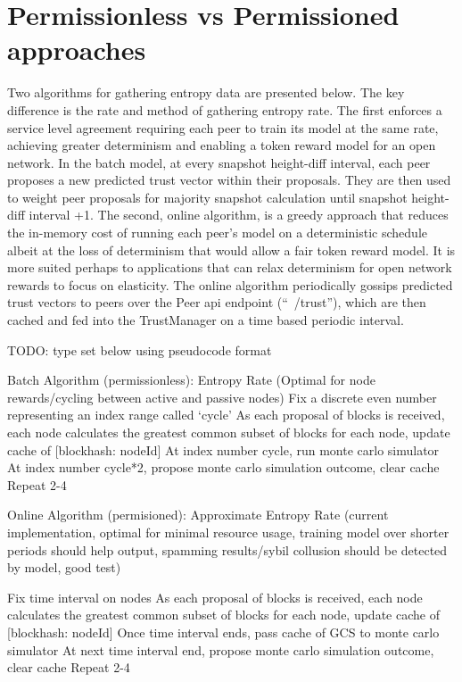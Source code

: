 \documentclass{article}
\begin{document}
\section {Permissionless vs Permissioned approaches}
Two algorithms for gathering entropy data are presented below. The key difference is the rate and method of gathering entropy rate. The first enforces a service level agreement requiring each peer to train its model at the same rate, achieving greater determinism and enabling a token reward model for an open network. In the batch model, at every snapshot height-diff interval, each peer proposes a new predicted trust vector within their proposals. They are then used to weight peer proposals for majority snapshot calculation until snapshot height-diff interval +1.
The second, online algorithm, is a greedy approach that reduces the in-memory cost of running each peer’s model on a deterministic schedule albeit at the loss of determinism that would allow a fair token reward model. It is more suited perhaps to applications that can relax determinism for  open network rewards to focus on elasticity. The online algorithm periodically gossips predicted trust vectors to peers over the Peer api endpoint (“~/trust”), which are then cached and fed into the TrustManager on a time based periodic interval.


TODO: type set below using pseudocode format

Batch Algorithm (permissionless): Entropy Rate (Optimal for node rewards/cycling between active and passive nodes)
Fix a discrete even number representing an index range called ‘cycle’
As each proposal of blocks is received, each node calculates the greatest common subset of blocks for each node, update cache of [blockhash: nodeId]
At index number cycle, run monte carlo simulator 
At index number cycle*2, propose monte carlo simulation outcome, clear cache
Repeat 2-4

Online Algorithm (permisioned): Approximate Entropy Rate (current implementation, optimal for minimal resource usage, training model over shorter periods should help output, spamming results/sybil collusion should be detected by model, good test)

Fix time interval on nodes 
As each proposal of blocks is received, each node calculates the greatest common subset of blocks for each node, update cache of [blockhash: nodeId]
Once time interval ends, pass cache of GCS to monte carlo simulator 
At next time interval end, propose monte carlo simulation outcome, clear cache
Repeat 2-4
\end{document}

